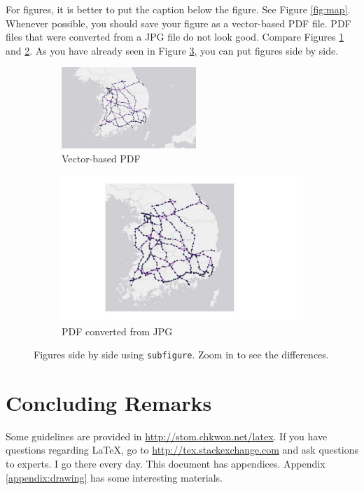 \documentclass[letterpaper, 11pt]{article}
\begin{document}
For figures, it is better to put the caption below the figure. See Figure \ref{fig:map}. Whenever possible, you should save your figure as a vector-based PDF file. PDF files that were converted from a JPG file do not look good. Compare Figures \ref{fig:map-pdf} and \ref{fig:map-jpg}. As you have already seen in Figure \ref{fig:side-by-side}, you can put figures side by side.



\begin{figure} \centering
\begin{subfigure}[b]{0.4\textwidth}
\includegraphics[width=2in]{map}
\caption{Vector-based PDF}
\label{fig:map-pdf}
\end{subfigure}
%
\begin{subfigure}[b]{0.4\textwidth}
\includegraphics[width=4in]{map-jpg}
\caption{PDF converted from JPG}
\label{fig:map-jpg}
\end{subfigure}
\caption{Figures side by side using \texttt{subfigure}. Zoom in to see the differences.}
\label{fig:side-by-side}
\end{figure}



\section{Concluding Remarks}

Some guidelines are provided in \url{http://stom.chkwon.net/latex}. If you have questions regarding \LaTeX, go to \url{http://tex.stackexchange.com} and ask questions to experts. I go there every day. This document has appendices. Appendix \ref{appendix:drawing} has some interesting materials.
\end{document}
